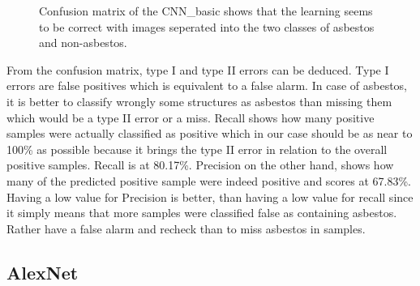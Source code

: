 \begin{figure}[!h]
\centering
\caption{Confusion matrix of the CNN\_basic shows that the learning seems to be correct with images seperated into the two classes of asbestos and non-asbestos.}
\label{fig:cnn-basic-cm}
\end{figure}

From the confusion matrix, type I and type II errors can be deduced. Type I errors are false positives which is equivalent to a false alarm. In case of asbestos, it is better to classify wrongly some structures as asbestos than missing them which would be a type II error or a miss. Recall shows how many positive samples were actually classified as positive which in our case should be as near to 100\% as possible because it brings the type II error in relation to the overall positive samples. Recall is at 80.17\%. Precision on the other hand, shows how many of the predicted positive sample were indeed positive and scores at 67.83\%. Having a low value for Precision is better, than having a low value for recall since it simply means that more samples were classified false as containing asbestos. Rather have a false alarm and recheck than to miss asbestos in samples. \\












\newpage


\subsection{AlexNet}


